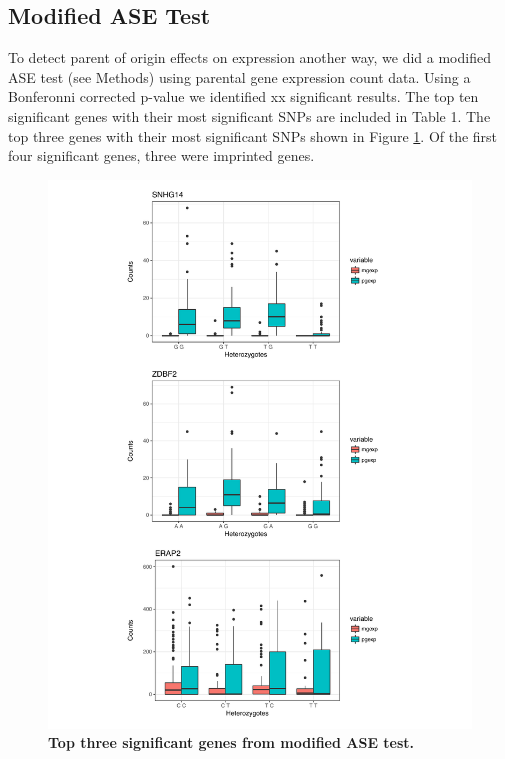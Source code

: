 \subsection{Modified ASE Test}\label{Modified ASE Test} 

To detect parent of origin effects on expression another way, we did a modified ASE test (see Methods) using parental gene expression count data. Using a Bonferonni corrected p-value we identified xx significant results. The top ten significant genes with their most significant SNPs are included in Table 1. The top three genes with their most significant SNPs shown in Figure \ref{fig:top3}. Of the first four significant genes, three were imprinted genes.


\begin{figure}[!htb]
\centering \includegraphics[width=5in]{img/ch04/fig-07-top3.pdf}
\caption[Top three significant genes from modified ASE test.]{\textbf{Top three significant genes from modified ASE test.} }
\label{fig:top3}
\end{figure}

